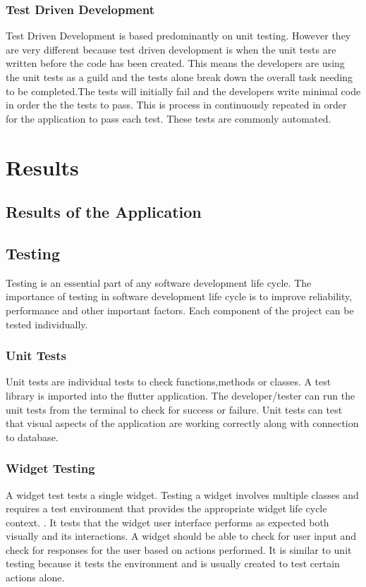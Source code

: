 \subsection{Test Driven Development}

Test Driven Development is based predominantly on unit testing. However they are very different because test driven development is when the unit tests are written before the code has been created. This means the developers are using the unit tests as a guild and the tests alone break down the overall task needing to be completed.The tests will initially fail and the developers write minimal code in order the the tests to pass. This is process in continuously repeated in order for the application to pass each test. These tests are commonly automated.\cite{TDD}

\chapter{Results}
\section{Results of the Application}
\section{Testing}
Testing is an essential part of any software development life cycle. The importance of testing in software development life cycle is to improve reliability, performance and other important factors.\cite{TestingLifeCycle} Each component of the project can be tested individually.
 
\subsection{Unit Tests}

Unit tests are individual tests to check functions,methods or classes. A test library is imported into the flutter application. The developer/tester can run the unit tests from the terminal to check for success or failure. Unit tests can test that visual aspects of the application are working correctly along with connection to database.

\subsection{Widget Testing}

A widget test tests a single widget. Testing a widget involves multiple classes and requires a test environment that provides the appropriate widget life cycle context. \cite{testing}. It tests that the widget user interface performs as expected both visually and its interactions. A widget should be able to check for user input and check for responses for the user based on actions performed. It is similar to unit testing because it tests the environment and is usually created to test certain actions alone.

